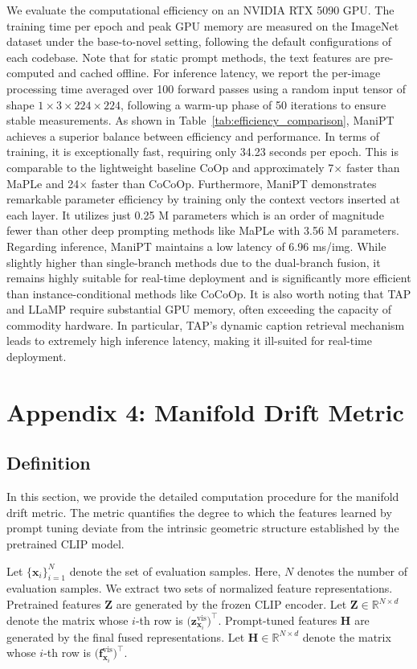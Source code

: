 \documentclass{article}
\theoremstyle{plain}
\theoremstyle{definition}
\theoremstyle{remark}
\begin{document}
	We evaluate the computational efficiency on an NVIDIA RTX 5090 GPU. The training time per epoch and peak GPU memory are measured on the ImageNet dataset under the base-to-novel setting, following the default configurations of each codebase. Note that for static prompt methods, the text features are pre-computed and cached offline. For inference latency, we report the per-image processing time averaged over 100 forward passes using a random input tensor of shape $1 \times 3 \times 224 \times 224$, following a warm-up phase of 50 iterations to ensure stable measurements. As shown in Table~\ref{tab:efficiency_comparison}, ManiPT achieves a superior balance between efficiency and performance. In terms of training, it is exceptionally fast, requiring only 34.23 seconds per epoch. This is comparable to the lightweight baseline CoOp and approximately 7$\times$ faster than MaPLe and 24$\times$ faster than CoCoOp. Furthermore, ManiPT demonstrates remarkable parameter efficiency by training only the context vectors inserted at each layer. It utilizes just 0.25 M parameters which is an order of magnitude fewer than other deep prompting methods like MaPLe with 3.56 M parameters. Regarding inference, ManiPT maintains a low latency of 6.96 ms/img. While slightly higher than single-branch methods due to the dual-branch fusion, it remains highly suitable for real-time deployment and is significantly more efficient than instance-conditional methods like CoCoOp. It is also worth noting that TAP and LLaMP require substantial GPU memory, often exceeding the capacity of commodity hardware. In particular, TAP's dynamic caption retrieval mechanism leads to extremely high inference latency, making it ill-suited for real-time deployment.
	\section{Appendix 4: Manifold Drift Metric}
	\label{app:drift_computation}
	\subsection{Definition}
	\label{app:drift_definition}
	In this section, we provide the detailed computation procedure for the manifold drift metric. The metric quantifies the degree to which the features learned by prompt tuning deviate from the intrinsic geometric structure established by the pretrained CLIP model.
	
	Let $\{\mathbf{x}_i\}_{i=1}^{N}$ denote the set of evaluation samples. Here, $N$ denotes the number of evaluation samples. We extract two sets of normalized feature representations. Pretrained features $\mathbf{Z}$ are generated by the frozen CLIP encoder. Let $\mathbf{Z} \in \mathbb{R}^{N \times d}$ denote the matrix whose $i$-th row is $\bigl(\mathbf{z}^{\mathrm{vis}}_{\mathbf{x}_i}\bigr)^\top$. Prompt-tuned features $\mathbf{H}$ are generated by the final fused representations. Let $\mathbf{H} \in \mathbb{R}^{N \times d}$ denote the matrix whose $i$-th row is $\bigl(\mathbf{f}^{\mathrm{vis}}_{\mathbf{x}_i}\bigr)^\top$.
	
\end{document}
